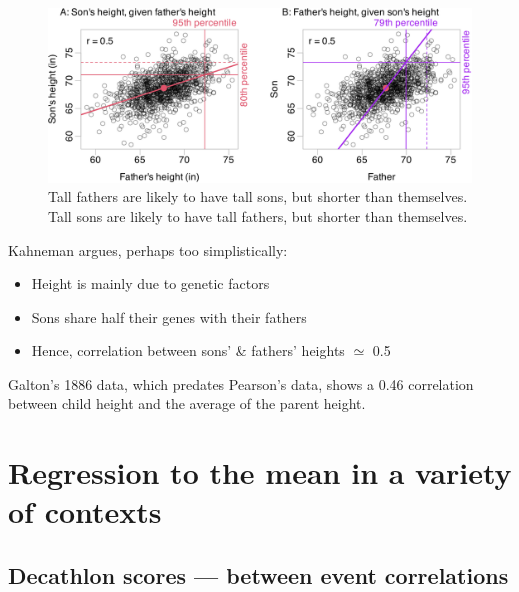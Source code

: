 \documentclass[
  10pt,
  b5paper]{book}
\providecommand{\tightlist}{%
  \setlength{\itemsep}{0pt}\setlength{\parskip}{0pt}}
\begin{document}
\begin{figure}

{\centering \includegraphics[width=1\linewidth]{07-regress_files/figure-latex/pearson-1} 

}

\caption{Tall fathers are likely to have tall sons, but shorter than themselves. 
Tall sons are likely to have tall fathers, but shorter than themselves.}\label{fig:pearson}
\end{figure}
\enlargethispage{27pt}

Kahneman argues, perhaps too simplistically:

\begin{itemize}
\tightlist
\item
  Height is mainly due to genetic factors
\item
  Sons share half their genes with their fathers
\item
  Hence, correlation between sons' \& fathers' heights \(\simeq\) 0.5
\end{itemize}

Galton's 1886 data, which predates Pearson's data, shows a 0.46
correlation between child height and the average of the parent
height.

\hypertarget{regression-to-the-mean-in-a-variety-of-contexts}{%
\section{Regression to the mean in a variety of contexts}\label{regression-to-the-mean-in-a-variety-of-contexts}}

\enlargethispage{21pt}

\hypertarget{decathlon-scores-between-event-correlations}{%
\subsection*{Decathlon scores --- between event correlations}\label{decathlon-scores-between-event-correlations}}
\end{document}
